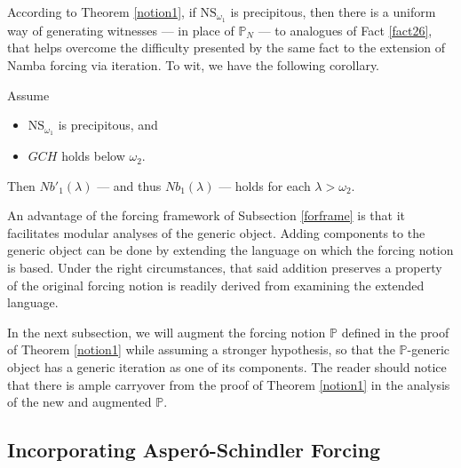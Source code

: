\documentclass[12pt]{article}
\numberwithin{equation}{section}
\begin{document}
According to Theorem \ref{notion1}, if $\mathrm{NS}_{\omega_1}$ is precipitous, then there is a uniform way of generating witnesses --- in place of $\mathbb{P}_N$ --- to analogues of Fact \ref{fact26}, that helps overcome the difficulty presented by the same fact to the extension of Namba forcing via iteration. To wit, we have the following corollary.

\begin{cor}\label{nambacoro}
Assume 
\begin{itemize}
    \item $\mathrm{NS}_{\omega_1}$ is precipitous, and
    \item $GCH$ holds below $\omega_2$.
\end{itemize}
Then $Nb'_1(\lambda)$ --- and thus $Nb_1(\lambda)$ --- holds for each $\lambda > \omega_2$. 
\end{cor}

An advantage of the forcing framework of Subsection \ref{forframe} is that it facilitates modular analyses of the generic object. Adding components to the generic object can be done by extending the language on which the forcing notion is based. Under the right circumstances, that said addition preserves a property of the original forcing notion is readily derived from examining the extended language.

In the next subsection, we will augment the forcing notion $\mathbb{P}$ defined in the proof of Theorem \ref{notion1} while assuming a stronger hypothesis, so that the $\mathbb{P}$-generic object has a generic iteration as one of its components. The reader should notice that there is ample carryover from the proof of Theorem \ref{notion1} in the analysis of the new and augmented $\mathbb{P}$.

\subsection{Incorporating Asper\'{o}-Schindler Forcing}\label{ss43}
\end{document}
